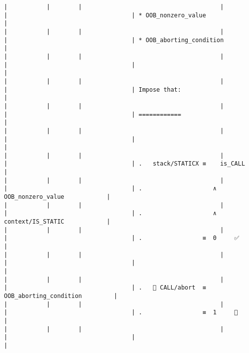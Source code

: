 \documentclass[varwidth=\maxdimen,margin=0.5cm,multi={verbatim}]{standalone}
\begin{document}
\begin{verbatim}
|           |        |                                       |                                 |                                   | * OOB_nonzero_value                                 |
|           |        |                                       |                                 |                                   | * OOB_aborting_condition                            |
|           |        |                                       |                                 |                                   |                                                     |
|           |        |                                       |                                 |                                   | Impose that:                                        |
|           |        |                                       |                                 |                                   | ============                                        |
|           |        |                                       |                                 |                                   |                                                     |
|           |        |                                       |                                 |                                   | .   stack/STATICX ≡    is_CALL                      |
|           |        |                                       |                                 |                                   | .                    ∧ OOB_nonzero_value            |
|           |        |                                       |                                 |                                   | .                    ∧ context/IS_STATIC            |
|           |        |                                       |                                 |                                   | .                 ≡  0     ✅                       |
|           |        |                                       |                                 |                                   |                                                     |
|           |        |                                       |                                 |                                   | .    CALL/abort  ≡  OOB_aborting_condition         |
|           |        |                                       |                                 |                                   | .                 ≡  1     👋                       |
|           |        |                                       |                                 |                                   |                                                     |

\end{verbatim}
\end{document}
